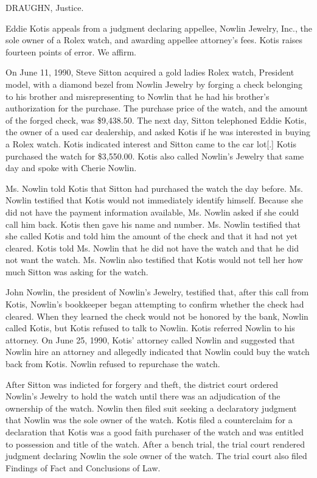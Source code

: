 
DRAUGHN, Justice.

Eddie Kotis appeals from a judgment declaring appellee, Nowlin Jewelry, Inc.,
the sole owner of a Rolex watch, and awarding appellee attorney's fees. Kotis
raises fourteen points of error. We affirm.

On June 11, 1990, Steve Sitton acquired a gold ladies Rolex watch, President
model, with a diamond bezel from Nowlin Jewelry by forging a check belonging to
his brother and misrepresenting to Nowlin that he had his brother's
authorization for the purchase. The purchase price of the watch, and the amount
of the forged check, was \$9,438.50. The next day, Sitton telephoned Eddie
Kotis, the owner of a used car dealership, and asked Kotis if he was interested
in buying a Rolex watch. Kotis indicated interest and Sitton came to the car
lot[.] Kotis purchased the watch for \$3,550.00. Kotis also called Nowlin's
Jewelry that same day and spoke with Cherie Nowlin.

Ms. Nowlin told Kotis that Sitton had purchased the watch the day before. Ms.
Nowlin testified that Kotis would not immediately identify himself. Because she
did not have the payment information available, Ms. Nowlin asked if she could
call him back. Kotis then gave his name and number. Ms. Nowlin testified that
she called Kotis and told him the amount of the check and that it had not yet
cleared. Kotis told Ms. Nowlin that he did not have the watch and that he did
not want the watch. Ms. Nowlin also testified that Kotis would not tell her how
much Sitton was asking for the watch.

John Nowlin, the president of Nowlin's Jewelry, testified that, after this call
from Kotis, Nowlin's bookkeeper began attempting to confirm whether the check
had cleared. When they learned the check would not be honored by the bank,
Nowlin called Kotis, but Kotis refused to talk to Nowlin. Kotis referred Nowlin
to his attorney. On June 25, 1990, Kotis' attorney called Nowlin and suggested
that Nowlin hire an attorney and allegedly indicated that Nowlin could buy the
watch back from Kotis. Nowlin refused to repurchase the watch.

After Sitton was indicted for forgery and theft, the district court ordered
Nowlin's Jewelry to hold the watch until there was an adjudication of the
ownership of the watch. Nowlin then filed suit seeking a declaratory judgment
that Nowlin was the sole owner of the watch. Kotis filed a counterclaim for a
declaration that Kotis was a good faith purchaser of the watch and was entitled
to possession and title of the watch. After a bench trial, the trial court
rendered judgment declaring Nowlin the sole owner of the watch. The trial court
also filed Findings of Fact and Conclusions of Law.

